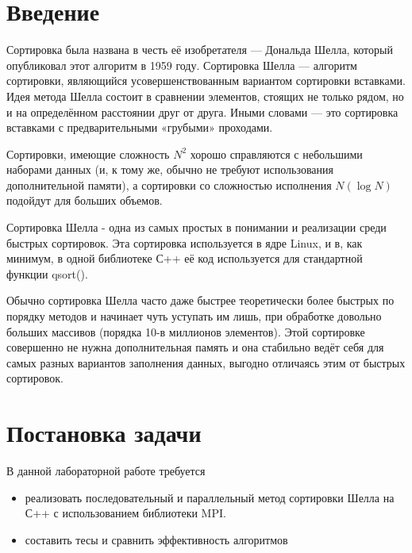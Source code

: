 \documentclass{report}
\begin{document}
	\setcounter{page}{2}
	
	\tableofcontents
	\newpage
	

\section*{Введение}
\par Сортировка была названа в честь её изобретателя — Дональда Шелла, который опубликовал этот алгоритм в 1959 году. Сортировка Шелла — алгоритм сортировки, являющийся усовершенствованным вариантом сортировки вставками. Идея метода Шелла состоит в сравнении элементов, стоящих не только рядом, но и на определённом расстоянии друг от друга. Иными словами — это сортировка вставками с предварительными «грубыми» проходами.
\par Сортировки, имеющие сложность \(N^2\) хорошо справляются с небольшими наборами данных (и, к тому же, обычно не требуют использования дополнительной памяти), а сортировки со сложностью исполнения \(N(\log N)\) подойдут для больших объемов.

\par Сортировка Шелла - одна из самых простых в понимании и реализации среди быстрых
сортировок. Эта сортировка используется в ядре Linux, и в, как минимум, в одной библиотеке
С++ её код используется для стандартной функции qsort().

\par Обычно сортировка Шелла часто даже быстрее теоретически более быстрых по порядку методов и начинает чуть уступать им лишь, при обработке довольно больших массивов (порядка 10-в миллионов элементов). Этой сортировке совершенно не нужна дополнительная память и она стабильно ведёт себя для самых разных вариантов заполнения данных, выгодно отличаясь этим от быстрых сортировок.
\newpage

\section*{Постановка задачи}
В данной лабораторной работе требуется
\begin{itemize}
\item реализовать последовательный и параллельный метод сортировки Шелла на С++ с использованием библиотеки MPI.
\item составить тесы и сравнить эффективность алгоритмов
\end{itemize}
\newpage
\end{document}
